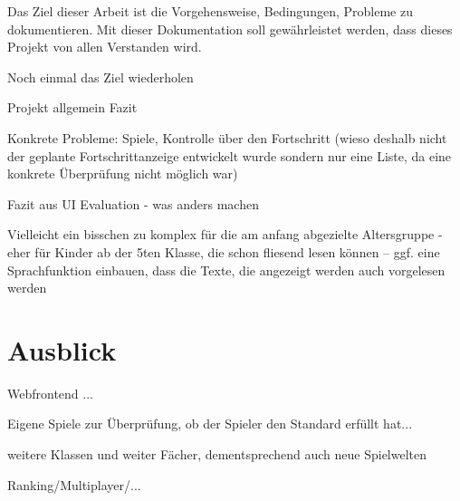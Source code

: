 Das Ziel dieser Arbeit ist die Vorgehensweise, Bedingungen, Probleme zu dokumentieren. Mit dieser Dokumentation soll gewährleistet werden, dass dieses Projekt von allen Verstanden wird.
	
	
	
	
	
		Noch einmal das Ziel wiederholen 
	
		Projekt allgemein Fazit
		
		Konkrete Probleme: Spiele, Kontrolle über den Fortschritt (wieso deshalb nicht der geplante Fortschrittanzeige entwickelt wurde sondern nur eine Liste, da eine konkrete Überprüfung nicht möglich war)
		
		Fazit aus UI Evaluation - was anders machen
		
		Vielleicht ein bisschen zu komplex für die am anfang abgezielte Altersgruppe - eher für Kinder ab der 5ten Klasse, die schon fliesend lesen können -- ggf. eine Sprachfunktion einbauen, dass die Texte, die angezeigt werden auch vorgelesen werden
		
		

	\section{Ausblick}
		Webfrontend ...
		
		Eigene Spiele zur Überprüfung, ob der Spieler den Standard erfüllt hat...
		
		weitere Klassen und weiter Fächer, dementsprechend auch neue Spielwelten
		
		Ranking/Multiplayer/...